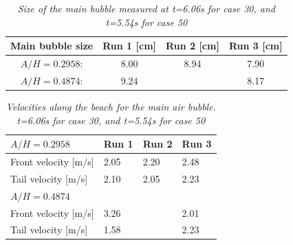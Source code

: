 \documentclass[a4paper, 11pt, english, twoside, openright]{article}
\begin{document}
\begin{table}[]
\centering
\caption{\textit{ Size of the main bubble measured at t=6.06s for case 30, and t=5.54s for case 50}}
\label{my-label}
\begin{tabular}{|c|c|c|c|}
\hline
\textbf{Main bubble size }              & \textbf{Run 1 {[}cm{]}} & \textbf{Run 2 {[}cm{]}} & \textbf{Run 3 {[}cm{]}} \\ \hline
$A/H=0.2958$:  & 8.00     & 8.94     & 7.90     \\ \hline
$A/H=0.4874$: & 9.24     &      & 8.17     \\ \hline
\end{tabular}
\label{tab:b_case30}
\end{table}
 
 
\begin{table}[]
\centering
\caption{\textit{ Velocities along the beach for the main air bubble.  t=6.06s for case 30, and t=5.54s for case 50}}
\label{vel_bubb}
\begin{tabular}{llll}
\hline
{\bf $A/H=0.2958$}                    & Run 1 & Run 2 & Run 3 \\ \hline
Front velocity {[}m/s{]}  & 2.05  & 2.20  & 2.48  \\
Tail velocity {[}m/s{]}  & 2.10  & 2.05  & 2.23  \\ \hline
{\bf $A/H=0.4874$}                    &       &       &       \\ \hline
Front velocity {[}m/s{]}  & 3.26  &   & 2.01  \\
Tail velocity {[}m/s{]}   & 1.58  &   & 2.23 
\end{tabular}
\end{table} 
 
\end{document}
